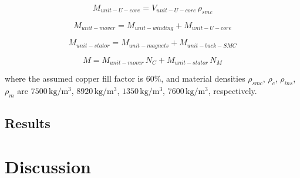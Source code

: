                     
                    \begin{equation}
                        M_{unit-U-core} =  V_{unit-U-core}\,\rho_{smc}
                        \label{eq:chap/rsm/LTFM/mass/M unit U-core smc}
                    \end{equation}
                    
                    
                    \begin{equation}
                        M_{unit-mover} =  M_{unit-winding}+M_{unit-U-core}
                        \label{eq:chap/rsm/LTFM/mass/M unit mover}
                    \end{equation}
                    
                    
                    \begin{equation}
                        M_{unit-stator} =  M_{unit-magnets}+M_{unit-back-SMC}
                        \label{eq:chap/rsm/LTFM/mass/M unit stator}
                    \end{equation}
                    
                    
                    \begin{equation}
                        M =  M_{unit-mover}\,N_C + M_{unit-stator}\,N_M
                        \label{eq:chap/rsm/LTFM/mass/total mass}
                    \end{equation}
                    
                    
                where the assumed copper fill factor is $60\%$, and material densities $\rho_{smc}$, $\rho_c$, $\rho_{ins}$, $\rho_{m}$ are $7500\,\mathrm{kg/m^3}$, $8920\,\mathrm{kg/m^3}$, $1350\,\mathrm{kg/m^3}$, $7600\,\mathrm{kg/m^3}$, respectively.

        \subsection{Results}                   \label{Chapter:RSM/LTFM/Results}
                
    
    \section{Discussion}                            \label{Chapter:RSM/discussion}
    
